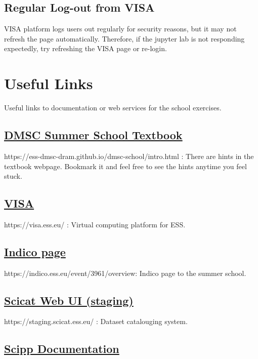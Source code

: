 \documentclass{article}
\begin{document}
\subsection{Regular Log-out from VISA}
VISA platform logs users out regularly for security reasons, but it may not refresh the page automatically.
Therefore, if the jupyter lab is not responding expectedly, try refreshing the VISA page or re-login.

\appendix
\section{Useful Links}

Useful links to documentation or web services for the school exercises.

\subsection{\href{https://ess-dmsc-dram.github.io/dmsc-school/intro.html}{DMSC Summer School Textbook}}

https://ess-dmsc-dram.github.io/dmsc-school/intro.html : There are hints in the textbook webpage. Bookmark it and feel free to see the hints anytime you feel stuck.

\subsection{\href{https://visa.ess.eu/}{VISA}}

https://visa.ess.eu/ : Virtual computing platform for ESS.

\subsection{\href{https://indico.ess.eu/event/3961/overview}{Indico page}}

https://indico.ess.eu/event/3961/overview: Indico page to the summer school.

\subsection{\href{https://staging.scicat.ess.eu/}{Scicat Web UI (staging)}}

https://staging.scicat.ess.eu/ : Dataset catalouging system.

\subsection{\href{https://scipp.github.io/}{Scipp Documentation}}
\end{document}
